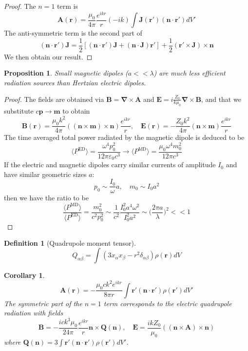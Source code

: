 \documentclass[a4paper]{article}
\theoremstyle{new}
\newtheorem{defi}{Definition}[section]
\newtheorem{prop}{Proposition}[section]
\newtheorem{cor}{Corollary}[section]
\begin{document}
\begin{proof}
The $n=1$ term is
$$\mathbf{A}(\mathbf{r})=\frac{\mu_0}{4\pi}\frac{e^{ikr}}{r}(-ik)\int\mathbf{J}(\mathbf{r'})(\mathbf{n}\cdot\mathbf{r'})dV'$$
The anti-symmetric term is the second part of 
$$(\mathbf{n}\cdot\mathbf{r'})\mathbf{J}=\frac{1}{2}[(\mathbf{n}\cdot\mathbf{r'})\mathbf{J}+(\mathbf{n}\cdot\mathbf{J})\mathbf{r'}]+\frac{1}{2}(\mathbf{r'}\times\mathbf{J})\times\mathbf{n}$$
We then obtain our result.
\end{proof}
\begin{prop}
Small magnetic dipoles ($a<<\lambda$) are much less efficient radiation sources than Hertzian electric dipoles.
\end{prop}
\begin{proof}
The fields are obtained via $\mathbf{B}=\boldsymbol{\nabla}\times\mathbf{A}$ and $\mathbf{E}=i\frac{Z_0}{k\mu_0}\boldsymbol{\nabla}\times\mathbf{B}$, and that we substitute $c\mathbf{p}\rightarrow\mathbf{m}$ to obtain
$$\mathbf{B}(\mathbf{r})=\frac{\mu_0k^2}{4\pi}((\mathbf{n}\times\mathbf{m})\times\mathbf{n})\frac{e^{ikr}}{r},\quad\mathbf{E}(\mathbf{r})=-\frac{Z_0k^2}{4\pi}(\mathbf{n}\times\mathbf{m})\frac{e^{ikr}}{r}$$
The time averaged total power radiated by the magnetic dipole is deduced to be
$$\langle P^{\text{ED}}\rangle=\frac{\omega^4p_0^2}{12\pi\varepsilon_0c^3}\rightarrow\langle P^{\text{MD}}\rangle=\frac{\mu_0\omega^4m_0^2}{12\pi c^3}$$
If the electric and magnetic dipoles carry similar currents of amplitude $I_0$ and have similar geometric sizes $a$:
$$p_0\sim\frac{I_0}{\omega}a,\quad m_0\sim I_0a^2$$
then we have the ratio to be
$$\frac{\langle P^{\text{MD}}\rangle}{\langle P^{\text{ED}}\rangle}=\frac{m_0^2}{c^2p_0^2}\sim\frac{1}{c^2}\frac{I_0^2a^4\omega^2}{I_0^2a^2}\sim\bigg(\frac{2\pi a}{\lambda}\bigg)^2<<1$$
\end{proof}
\begin{defi}[Quadrupole moment tensor]
$$Q_{\alpha\beta}=\int(3x_\alpha x_\beta -r^2\delta_{\alpha\beta})\rho(\mathbf{r})dV$$
\end{defi}
\begin{cor}
$$\mathbf{A}(\mathbf{r})=-\frac{\mu_0ck^2e^{ikr}}{8\pi r}\int\mathbf{r'}(\mathbf{n}\cdot\mathbf{r'})\rho(\mathbf{r'})dV'$$
The symmetric part of the $n=1$ term corresponds to the electric quadrupole radiation with fields
$$\mathbf{B}=-\frac{ick^3\mu_0}{24\pi}\frac{e^{ikr}}{r}\mathbf{n}\times\mathbf{Q}(\mathbf{n}),\quad\mathbf{E}=\frac{ikZ_0}{\mu_0}((\mathbf{n}\times\mathbf{A})\times\mathbf{n})$$
where $\mathbf{Q}(\mathbf{n})=3\int\mathbf{r'}(\mathbf{n}\cdot\mathbf{r'})\rho(\mathbf{r'})dV'$.
\end{cor}
\end{document}
